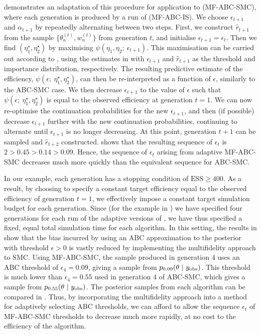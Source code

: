 \documentclass[review]{siamonline190516}
\begin{document}
 demonstrates an adaptation of this procedure for application to  (MF-ABC-SMC), where each generation is produced by a run of  (MF-ABC-IS).
We choose $\epsilon_{t+1}$ and $\alpha_{t+1}$ by repeatedly alternating between two steps.
First, we construct $\hat r_{t+1}$ from the sample $\{ \theta_n^{(t)}, w_n^{(t)} \}$ from generation $t$, and initialise $\epsilon_{t+1} = \epsilon_t$.
Then we find $(\eta_1^\star, \eta_2^\star)$ by maximising $\psi(\eta_1,\eta_2;~\epsilon_{t+1})$.
This maximisation can be carried out according to , using the estimates in  with $\epsilon_{t+1}$ and $\hat r_{t+1}$ as the threshold and importance distribution, respectively.
The resulting predictive estimate of the efficiency, $\psi(\epsilon;~\eta_1^\star, \eta_2^\star)$, can then be re-interpreted as a function of $\epsilon$, similarly to the ABC-SMC case.
We then decrease $\epsilon_{t+1}$ to the value of $\epsilon$ such that $\psi(\epsilon;~\eta_1^\star,\eta_2^\star)$ is equal to the observed efficiency at generation $t=1$.
We can now re-optimise the continuation probabilities for the new $\epsilon_{t+1}$, and then (if possible) decrease $\epsilon_{t+1}$ further with the new continuation probabilities, continuing to alternate until $\epsilon_{t+1}$ is no longer decreasing.
At this point, generation $t+1$ can be sampled and $\hat r_{t+2}$ constructed.
 shows that the resulting sequence of $\epsilon_t$ is $2 > 0.45 > 0.14 > 0.09$.
Hence, the sequence of $\epsilon_t$ arising from adaptive MF-ABC-SMC decreases much more quickly than the equivalent sequence for ABC-SMC.

In our example, each generation has a stopping condition of $\mathrm{ESS} \geq 400$.
As a result, by choosing to specify a constant target efficiency equal to the observed efficiency of generation $t=1$, we effectively impose a constant target simulation budget for each generation.
Since (for the example in ) we have specified four generations for each run of the adaptive versions of , we have thus specified a fixed, equal total simulation time for each algorithm.
In this setting, the results in  show that the bias incurred by using an ABC approximation to the posterior with threshold $\epsilon>0$ is vastly reduced by implementing the multifidelity approach to SMC.
Using MF-ABC-SMC, the sample produced in generation $4$ uses an ABC threshold of $\epsilon_4 = 0.09$, giving a sample from $p_{0.09}(\theta~|~y_{\mathrm{obs}})$.
This threshold is much lower than $\epsilon_4 = 0.55$ used in generation $4$ of ABC-SMC, which gives a sample from $p_{0.55}(\theta~|~y_{\mathrm{obs}})$.
The posterior samples from each algorithm can be compared in .
Thus, by incorporating the multifidelity approach into a method for adaptively selecting ABC thresholds, we can afford to allow the sequence $\epsilon_t$ of MF-ABC-SMC thresholds to decrease much more rapidly, at no cost to the efficiency of the algorithm.
\end{document}

